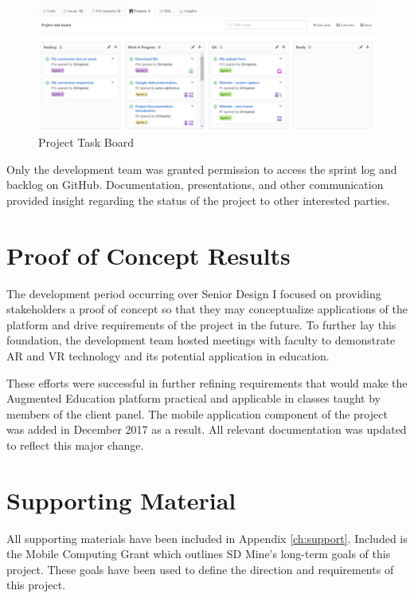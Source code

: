 \begin{figure}[H]
    \centering
    \includegraphics[width=\textwidth]{ProjectTaskBoard.png}
    \caption{Project Task Board}
    \label{fig:ProjectTaskBoard}
\end{figure}

Only the development team was granted permission to access the sprint log and backlog on GitHub. Documentation, presentations, and other communication provided insight regarding the status of the project to other interested parties. 


\section{Proof of Concept Results}

The development period occurring over Senior Design I focused on providing stakeholders a proof of concept so that they may conceptualize applications of the platform and drive requirements of the project in the future. To further lay this foundation, the development team hosted meetings with faculty to demonstrate AR and VR technology and its potential application in education. 

These efforts were successful in further refining requirements that would make the Augmented Education platform practical and applicable in classes taught by members of the client panel. The mobile application component of the project was added in December 2017 as a result. All relevant documentation was updated to reflect this major change. 

\section{Supporting Material}

All supporting materials have been included in Appendix \ref{ch:support}. Included is the Mobile Computing Grant which outlines SD Mine's long-term goals of this project. These goals have been used to define the direction and requirements of this project.
